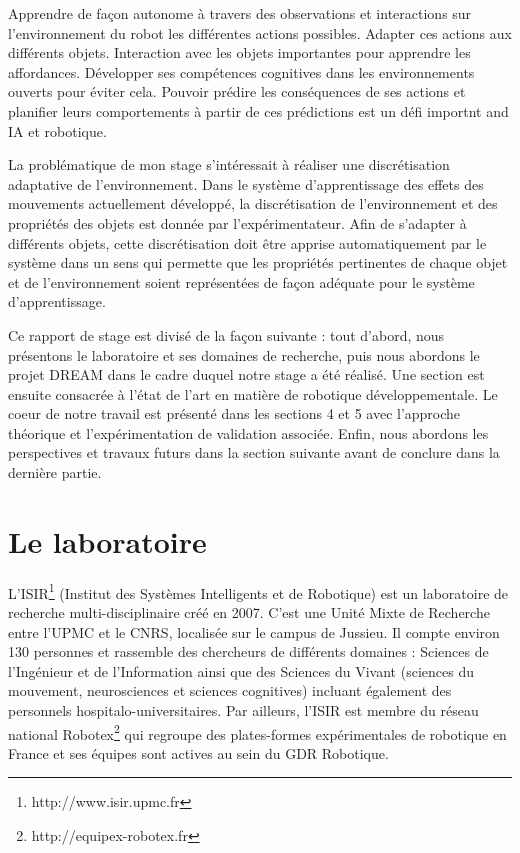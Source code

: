 \documentclass[draft]{llncs}
\begin{document}
Apprendre de façon autonome à travers des observations et interactions sur l'environnement du robot les différentes actions possibles.
Adapter ces actions aux différents objets.
Interaction avec les objets importantes pour apprendre les affordances.
Développer ses compétences cognitives dans les environnements ouverts pour éviter cela.
Pouvoir prédire les conséquences de ses actions et planifier leurs comportements à partir de ces prédictions est un défi importnt and IA et robotique.



La problématique de mon stage s'intéressait à réaliser une discrétisation adaptative de l'environnement.
Dans le système d'apprentissage des effets des mouvements actuellement développé, la discrétisation de l'environnement et des propriétés des objets est donnée par l'expérimentateur.
Afin de s'adapter à différents objets, cette discrétisation doit être apprise automatiquement par le système dans un sens qui permette que les propriétés pertinentes de chaque objet et de l'environnement soient représentées de façon adéquate pour le système d'apprentissage.

Ce rapport de stage est divisé de la façon suivante : tout d'abord, nous présentons le laboratoire et ses domaines de recherche, puis nous abordons le projet DREAM dans le cadre duquel notre stage a été réalisé.
Une section est ensuite consacrée à l'état de l'art en matière de robotique développementale.
Le coeur de notre travail est présenté dans les sections 4 et 5 avec l'approche théorique et l'expérimentation de validation associée.
Enfin, nous abordons les perspectives et travaux futurs dans la section suivante avant de conclure dans la dernière partie.


\section{Le laboratoire}

\lettrine{L}{'ISIR}\footnote{http://www.isir.upmc.fr} (Institut des Systèmes Intelligents et de Robotique) est un laboratoire de recherche multi-disciplinaire créé en 2007.
C'est une Unité Mixte de Recherche entre l'UPMC et le CNRS, localisée sur le campus de Jussieu.
Il compte environ 130 personnes et rassemble des chercheurs de différents domaines : Sciences de l’Ingénieur et de l’Information ainsi que des Sciences du Vivant (sciences du mouvement, neurosciences et sciences cognitives) incluant également des personnels hospitalo-universitaires.
Par ailleurs, l'ISIR est membre du réseau national Robotex\footnote{http://equipex-robotex.fr} qui regroupe des plates-formes expérimentales de robotique en France et ses équipes sont actives au sein du GDR Robotique.
\end{document}
